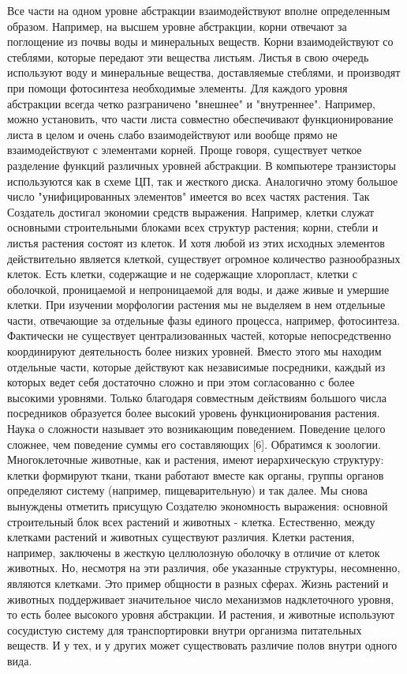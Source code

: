 \documentclass[10pt]{article}
\begin{document}
Все части на одном уровне абстракции взаимодействуют вполне определенным образом. Например, на высшем уровне абстракции, корни отвечают за поглощение из почвы воды и минеральных веществ. Корни взаимодействуют со стеблями, которые передают эти вещества листьям. Листья в свою очередь используют воду и минеральные вещества, доставляемые стеблями, и производят при помощи фотосинтеза необходимые элементы. 
Для каждого уровня абстракции всегда четко разграничено "внешнее" и "внутреннее". Например, можно установить, что части листа совместно обеспечивают функционирование листа в целом и очень слабо взаимодействуют или вообще прямо не взаимодействуют с элементами корней. Проще говоря, существует четкое разделение функций различных уровней абстракции. 
В компьютере транзисторы используются как в схеме ЦП, так и жесткого диска. Аналогично этому большое число "унифицированных элементов" имеется во всех частях растения. Так Создатель достигал экономии средств выражения. Например, клетки служат основными строительными блоками всех структур растения; корни, стебли и листья растения состоят из клеток. И хотя любой из этих исходных элементов действительно является клеткой, существует огромное количество разнообразных клеток. Есть клетки, содержащие и не содержащие хлоропласт, клетки с оболочкой, проницаемой и непроницаемой для воды, и даже живые и умершие клетки. 
При изучении морфологии растения мы не выделяем в нем отдельные части, отвечающие за отдельные фазы единого процесса, например, фотосинтеза. Фактически не существует централизованных частей, которые непосредственно координируют деятельность более низких уровней. Вместо этого мы находим отдельные части, которые действуют как независимые посредники, каждый из которых ведет себя достаточно сложно и при этом согласованно с более высокими уровнями. Только благодаря совместным действиям большого числа посредников образуется более высокий уровень функционирования растения. Наука о сложности называет это возникающим поведением. Поведение целого сложнее, чем поведение суммы его составляющих [6]. 
Обратимся к зоологии. Многоклеточные животные, как и растения, имеют иерархическую структуру: клетки формируют ткани, ткани работают вместе как органы, группы органов определяют систему (например, пищеварительную) и так далее. Мы снова вынуждены отметить присущую Создателю экономность выражения: основной строительный блок всех растений и животных - клетка. Естественно, между клетками растений и животных существуют различия. Клетки растения, например, заключены в жесткую целлюлозную оболочку в отличие от клеток животных. Но, несмотря на эти различия, обе указанные структуры, несомненно, являются клетками. Это пример общности в разных сферах. 
Жизнь растений и животных поддерживает значительное число механизмов надклеточного уровня, то есть более высокого уровня абстракции. И растения, и животные используют сосудистую систему для транспортировки внутри организма питательных веществ. И у тех, и у других может существовать различие полов внутри одного вида. 
\end{document}
